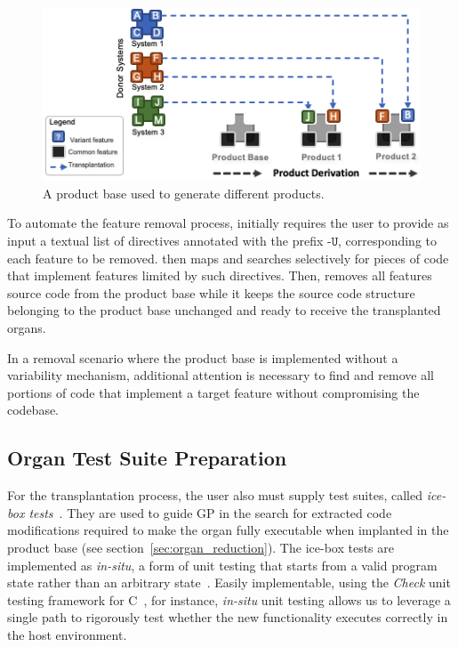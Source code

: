 \begin{figure}[t]
	\centering \includegraphics[width=\columnwidth]{images/product_for_transplantation.png}
	\centering 
	\caption{A product base used to generate different products.}
	\label{fig:product_for_transplantation}
\end{figure} 

To automate the feature removal process, \autoscalpel initially requires the user to provide as input a textual list of directives annotated with the prefix $\texttt{-U}$, corresponding to each feature to be removed. \autoscalpel then maps and searches selectively for pieces of code that implement features limited by such directives. Then, \autoscalpel removes all features source code from the product base while it keeps the source code structure belonging to the product base unchanged and ready to receive the transplanted organs.

In a removal scenario where the product base is implemented without a variability mechanism, additional attention is necessary to find and remove all portions of code that implement a target feature without compromising the codebase.


\subsection{Organ Test Suite Preparation}

For the transplantation process, the user also must supply test suites, called \emph{ice-box tests}~\cite{Barr2015}. They are used to guide GP in the search for extracted code modifications required to make the organ fully executable when implanted in the product base (see section~\ref{sec:organ_reduction}). The ice-box tests are implemented as \emph{in-situ}, a form of unit testing that starts from a valid program state rather than an arbitrary state~\cite{Barr2015}. Easily implementable, using the \emph{Check} unit testing framework for C~\cite{Check2019}, for instance, \emph{in-situ} unit testing allows us to leverage a single path to rigorously test whether the new functionality executes correctly in the host environment. 

